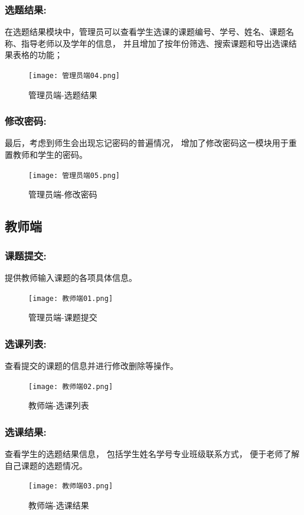 \subsubsection{选题结果:}
在选题结果模块中，管理员可以查看学生选课的课题编号、学号、姓名、课题名称、指导老师以及学年的信息，
并且增加了按年份筛选、搜索课题和导出选课结果表格的功能；
\begin{figure}[h]
    \centering
    \texttt{[image: 管理员端04.png]}
    \caption{管理员端-选题结果}
    \label{fig:manager04}
\end{figure}

\subsubsection{修改密码:}
最后，考虑到师生会出现忘记密码的普遍情况，
增加了修改密码这一模块用于重置教师和学生的密码。
\begin{figure}[ht]
    \centering
    \texttt{[image: 管理员端05.png]}
    \caption{管理员端-修改密码}
    \label{fig:manager05}
\end{figure}


\subsection{教师端}
\subsubsection{课题提交:}
提供教师输入课题的各项具体信息。
\begin{figure}[ht]
    \centering
    \texttt{[image: 教师端01.png]}
    \caption{管理员端-课题提交}
    \label{fig:teacher01}
\end{figure}

\subsubsection{选课列表:}
查看提交的课题的信息并进行修改删除等操作。
\begin{figure}[ht]
    \centering
    \texttt{[image: 教师端02.png]}
    \caption{教师端-选课列表}
    \label{fig:teacher02}
\end{figure}

\subsubsection{选课结果:}
查看学生的选题结果信息，
包括学生姓名学号专业班级联系方式，
便于老师了解自己课题的选题情况。
\begin{figure}[ht]
    \centering
    \texttt{[image: 教师端03.png]}
    \caption{教师端-选课结果}
    \label{fig:teacher03}
\end{figure}

